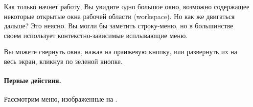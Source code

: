 \documentclass[a4paper,10pt,twoside]{book}
\begin{document}

Как только \pharo начнет работу, Вы увидите одно большое окно,
возможно содержащее некоторые открытые окна рабочей области
(workspace). Но как же двигаться дальше? Это неясно.
Вы могли бы заметить строку-меню, но в большинстве своем
\pharo использует контекстно-зависимые всплывающие меню.




Вы можете свернуть окна, нажав на оранжевую кнопку,
или развернуть их на весь экран, кликнув по зеленой кнопке.

\paragraph{Первые действия.}


Рассмотрим меню, изображенные на . 


\end{document}
